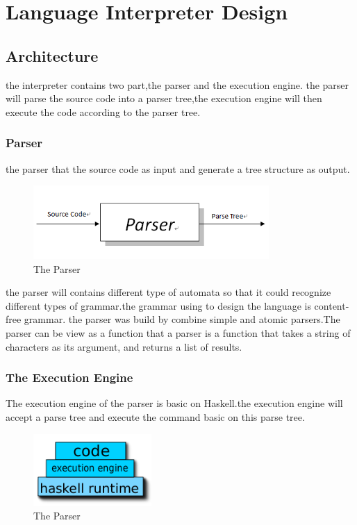 \chapter{Language Interpreter Design}
\section{Architecture}
the interpreter contains two part,the parser and the execution engine. the
parser will parse the source code into a parser tree,the execution engine will
then execute the code according to the parser tree.

\subsection{Parser}
the parser that the source code as input and generate a tree structure as
output.

\begin{figure}[h!]
  \centering
	\includegraphics[width=0.80\textwidth]{pic/c4/parser.png}
	\caption{The Parser}
\end{figure}
the parser will contains different type of automata so that it could recognize different types of grammar.the grammar using to design the language
is content-free grammar.
the parser was build by combine simple and atomic parsers.The parser
can be view as a function that a parser is a function that takes a string of
characters as its argument, and returns a list of results.\cite{aho1986compilers}

\subsection{The Execution Engine}
The execution engine of the parser is basic on Haskell.the execution engine
will accept a parse tree and execute the command basic on this parse tree.
\begin{figure}[h!]
  \centering
	\includegraphics[width=0.40\textwidth]{pic/c4/structure.png}
	\caption{The Parser}
\end{figure}



